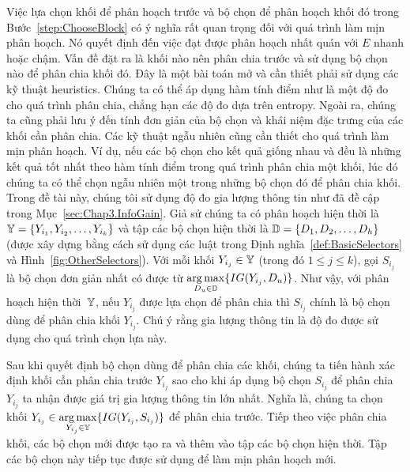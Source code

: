 Việc lựa chọn khối để phân hoạch trước và bộ chọn để phân hoạch khối đó trong Bước~\ref{step:ChooseBlock} có ý nghĩa rất quan trọng đối với quá trình làm mịn phân hoạch. 
Nó quyết định đến việc đạt được phân hoạch nhất quán với $E$ nhanh hoặc chậm. 
Vấn đề đặt ra là khối nào nên phân chia trước và sử dụng bộ chọn nào để phân chia khối đó. Đây là một bài toán mở và cần thiết phải sử dụng các kỹ thuật heuristics. Chúng ta có thể áp dụng hàm tính điểm như là một độ đo cho quá trình phân chia, chẳng hạn các độ đo dựa trên entropy. Ngoài ra, chúng ta cũng phải lưu ý đến tính đơn giản của bộ chọn và khái niệm đặc trưng của các khối cần phân chia. Các kỹ thuật ngẫu nhiên cũng cần thiết cho quá trình làm mịn phân hoạch. Ví dụ, nếu các bộ chọn cho kết quả giống nhau và đều là những kết quả tốt nhất theo hàm tính điểm trong quá trình phân chia một khối, lúc đó chúng ta có thể chọn ngẫu nhiên một trong những bộ chọn đó để phân chia khối. Trong đề tài này, chúng tôi sử dụng độ đo gia lượng thông tin như đã đề cập trong Mục~\ref{sec:Chap3.InfoGain}.
Giả sử chúng ta có phân hoạch hiện thời là $\mathbb{Y}= \{Y_{i_1}, Y_{i_2}, \ldots, Y_{i_k}\}$ và tập các bộ chọn hiện thời là $\mathbb{D}=\{D_1, D_2, \ldots, D_h\}$ (được xây dựng bằng cách sử dụng các luật trong Định nghĩa~\ref{def:BasicSelectors} và Hình~\ref{fig:OtherSelectors}).
%
Với mỗi khối $Y_{i_j} \in \mathbb{Y}$ (trong đó $1 \leq j \leq k$), gọi $S_{i_j}$ là bộ chọn đơn giản nhất có được từ $\underset{D_u \in \mathbb{D}}{\arg \max}\{IG(Y_{i_j}, D_u)\}$. Như vậy, với phân hoạch hiện thời~$\mathbb{Y}$, nếu $Y_{i_j}$ được lựa chọn để phân chia thì $S_{i_j}$ chính là bộ chọn dùng để phân chia khối $Y_{i_j}$. Chú ý rằng gia lượng thông tin là độ đo được sử dụng cho quá trình chọn lựa này.

Sau khi quyết định bộ chọn dùng để phân chia các khối, chúng ta tiến hành xác định khối cần phân chia trước $Y_{i_j}$ sao cho khi áp dụng bộ chọn $S_{i_j}$ để phân chia $Y_{i_j}$ ta nhận được giá trị gia lượng thông tin lớn nhất. Nghĩa là, chúng ta chọn khối $Y_{i_j} \in \underset{Y_{i_j} \in \mathbb{Y}}{\arg \max}{\{IG(Y_{i_j}, S_{i_j})\}}$ để phân chia trước.
%
Tiếp theo việc phân chia khối, các bộ chọn mới được tạo ra và thêm vào tập các bộ chọn hiện thời. Tập các bộ chọn này tiếp tục được sử dụng để làm mịn phân hoạch mới.
%

